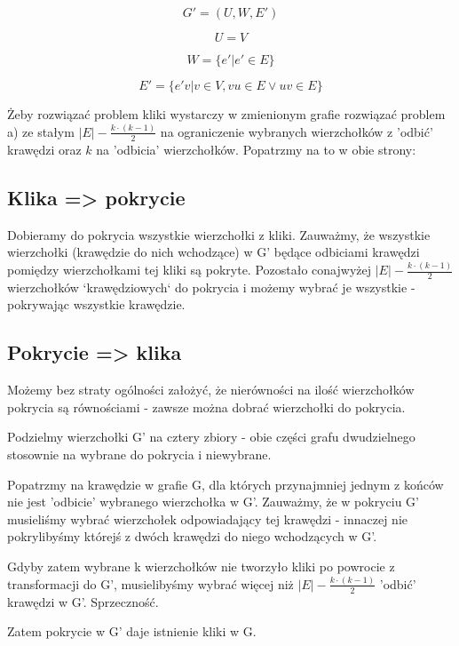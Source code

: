 \documentclass[12pt]{article}
\begin{document}
\[ G' = (U, W, E') \]

\[ U = V \]

\[ W = \{ e' |e' \in E \} \]

\[ E' = \{ e'v | v \in V, vu \in E \lor uv \in E \} \]

Żeby rozwiązać problem kliki wystarczy w zmienionym grafie rozwiązać problem a) ze stałym $|E| - \frac{k \cdot (k-1)}{2}$ na ograniczenie wybranych wierzchołków z 'odbić' krawędzi oraz $k$ na 'odbicia' wierzchołków. Popatrzmy na to w obie strony:

\subsection{Klika => pokrycie}

Dobieramy do pokrycia wszystkie wierzchołki z kliki. Zauważmy, że wszystkie wierzchołki (krawędzie do nich wchodzące) w G' będące odbiciami krawędzi pomiędzy wierzchołkami tej kliki są pokryte. Pozostało conajwyżej $|E| - \frac{k \cdot (k-1)}{2}$ wierzchołków `krawędziowych` do pokrycia i możemy wybrać je wszystkie - pokrywając wszystkie krawędzie.

\subsection{Pokrycie => klika}

Możemy bez straty ogólności założyć, że nierówności na ilość wierzchołków pokrycia są równościami - zawsze można dobrać wierzchołki do pokrycia.

Podzielmy wierzchołki G' na cztery zbiory - obie części grafu dwudzielnego stosownie na wybrane do pokrycia i niewybrane.

Popatrzmy na krawędzie w grafie G, dla których przynajmniej jednym z końców nie jest 'odbicie' wybranego wierzchołka w G'. Zauważmy, że w pokryciu G' musieliśmy wybrać wierzchołek odpowiadający tej krawędzi - innaczej nie pokrylibyśmy którejś z dwóch krawędzi do niego wchodzących w G'.

Gdyby zatem wybrane k wierzchołków nie tworzyło kliki po powrocie z transformacji do G', musielibyśmy wybrać więcej niż $|E| - \frac{k \cdot (k-1)}{2}$ 'odbić' krawędzi w G'.
Sprzeczność.

Zatem pokrycie w G' daje istnienie kliki w G.
\end{document}
